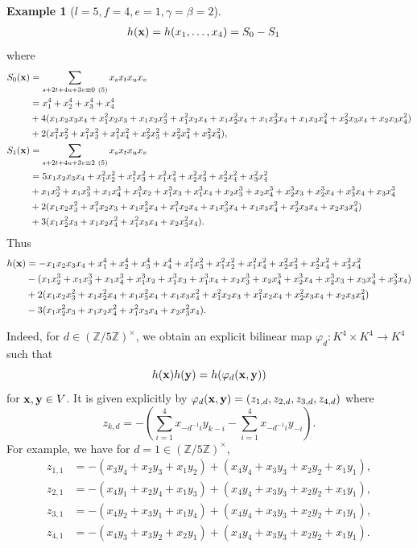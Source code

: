 \documentclass[a4paper, 11pt]{amsart}
\newcommand{\Z}{\mathbb Z}
\theoremstyle{plain}
\theoremstyle{definition}
\newtheorem{example}[thm]{Example}
\numberwithin{equation}{section}
\begin{document}
\begin{example}
[$l=5, f=4, e=1, \gamma =\beta =2$]
\begin{align*}
h({\bf x})=h(x_1,\ldots,x_4)&=S_0 - S_1
\end{align*}
where
\begin{align*}
S_0({\bf x})&= \sum_{s + 2t + 4u + 3v\equiv 0 \ (5)} x_{s}x_{t}x_{u}x_{v}\\
&= x_1^4 + x_2^4 + x_3^4 + x_4^4\\
&+ 4(
x_1x_2x_3x_4 
+x_1^2x_2x_3 
+ x_1x_2x_3^2 
+ x_1^2x_2x_4 
+ x_1x_2^2x_4 
+ x_1x_3^2x_4
+ x_1x_3x_4^2 
+ x_2^2x_3x_4 
+ x_2x_3x_4^2 
) \\
&+ 2(x_1^2x_2^2  
+ x_1^2x_3^2 
+ x_1^2x_4^2 
+ x_2^2x_3^2  
+ x_2^2x_4^2 
+ x_3^2x_4^2 ),\\
%
S_1({\bf x})&= \sum_{s + 2t + 4u + 3v\equiv 2 \ (5)} x_{s}x_{t}x_{u}x_{v}\\
&= 5x_1x_2x_3x_4 + x_1^2x_2^2 + x_1^2x_3^2 + x_1^2x_4^2 + x_2^2x_3^2+ x_2^2x_4^2 + x_3^2x_4^2 \\
&+ x_1x_2^3 + x_1x_3^3 + x_1x_4^3 
+ x_1^3x_2 + x_1^3x_3 + x_1^3x_4 
+ x_2x_3^3 + x_2x_4^3 
+ x_2^3x_3 + x_2^3x_4 
+ x_3^3x_4   + x_3x_4^3 \\
& + 2(x_1x_2x_3^2  +  x_1^2x_2x_3 
+ x_1x_2^2x_4  +  x_1^2x_2x_4 
+ x_1x_3^2x_4 + x_1x_3x_4^2 
+ x_2^2x_3x_4 + x_2x_3x_4^2 ) \\
&+ 3(x_1x_2^2x_3 + x_1x_2x_4^2 + x_1^2x_3x_4 + x_2x_3^2x_4 ).
%
\end{align*}
Thus
\begin{align*}
h({\bf x})&= - x_1x_2x_3x_4 
+ x_1^4 + x_2^4 + x_3^4  + x_4^4 
+ x_1^2x_3^2 + x_1^2x_2^2  + x_1^2x_4^2 + x_2^2x_3^2 + x_2^2x_4^2 + x_3^2x_4^2 \\
&- (x_1x_2^3 + x_1x_3^3 + x_1x_4^3  
+ x_1^3x_2   + x_1^3x_3   + x_1^3x_4  
+ x_2x_3^3 + x_2x_4^3
+ x_2^3x_4 + x_2^3x_3
+ x_3x_4^3 + x_3^3x_4  )\\
&+ 2( x_1x_2x_3^2  + x_1x_2^2x_4 + x_1x_3^2x_4 + x_1x_3x_4^2 
+ x_1^2x_2x_3 + x_1^2x_2x_4 + x_2^2x_3x_4  + x_2x_3x_4^2)\\
&- 3(x_1x_2^2x_3 + x_1x_2x_4^2 + x_1^2x_3x_4 + x_2x_3^2x_4).
\end{align*}

Indeed, for $d \in (\Z/5\Z)^\times$, we obtain an explicit bilinear map
$\varphi_d : K^4 \times K^4 \to K^4$
such that
\[
h({\bf x})h({\bf y}) = h(\varphi_d({\bf x},{\bf y}))
\]
for ${\bf x},{\bf y}\in V$.
It is given explicitly by $\varphi_d({\bf x},{\bf y})
= (z_{1,d}, z_{2,d}, z_{3,d}, z_{4,d})$
where
\[
z_{k,d}
= -\left(\sum_{i=1}^{4}x_{-d^{-1}i}y_{k-i} - \sum_{i=1}^{4}x_{-d^{-1}i}y_{-i}\right).
\]
For example, we have for $d=1 \in (\Z/5\Z)^\times$,
\begin{align*}
z_{1,1}
&=-(x_3y_4 + x_2y_3 + x_1y_2 )
+(x_4y_4 + x_3y_3 + x_2y_2 + x_1y_1 ),\\
z_{2,1}
&=-(x_{4}y_1 + x_2y_4 + x_1y_3 )
+(x_{4}y_4 + x_3y_3 + x_2y_2 + x_1y_1 ),\\
z_{3,1}
&=-(x_4y_2 + x_3y_1 + x_1y_4 )
+(x_4y_4 + x_3y_3 + x_2y_2 + x_1y_1 ),\\
z_{4,1}
&=-(x_{4}y_3 + x_3y_2 + x_2y_1)
+(x_{4}y_4 + x_3y_3 + x_2y_2 + x_1y_1 ).
\end{align*}
\end{example}
\end{document}
